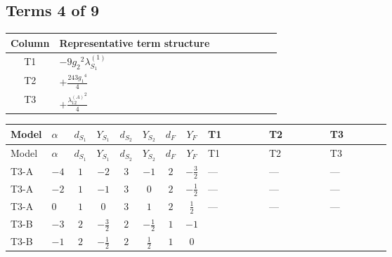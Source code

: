 \documentclass[8pt]{article}
\begin{document}
\begin{landscape}
\subsection*{Terms 4 of 9}
\begin{center}
\begin{tabular}{@{}c >{\raggedright\arraybackslash}p{0.82\linewidth}@{}}
\toprule
Column & Representative term structure \\
\midrule
T1 & \(\displaystyle -9 {g_2}^2 {\lambda_{S_1}^{(1)}}\) \\
\midrule
T2 & \(\displaystyle +\frac{243 {g_1}^4}{4}\) \\
\midrule
T3 & \(\displaystyle +\frac{{\lambda_{12}^{(A)}}^2}{4}\) \\
\midrule
\bottomrule
\end{tabular}
\end{center}
\smallskip
\tiny
\begin{longtable}{@{}llcccccc >{\raggedright\arraybackslash}p{0.21\linewidth} >{\raggedright\arraybackslash}p{0.21\linewidth} >{\raggedright\arraybackslash}p{0.21\linewidth}@{}}
\toprule
Model & $\alpha$ & $d_{S_1}$ & $Y_{S_1}$ & $d_{S_2}$ & $Y_{S_2}$ & $d_F$ & $Y_F$ & T1 & T2 & T3 \\
\midrule
\endfirsthead
\toprule
Model & $\alpha$ & $d_{S_1}$ & $Y_{S_1}$ & $d_{S_2}$ & $Y_{S_2}$ & $d_F$ & $Y_F$ & T1 & T2 & T3 \\
\midrule
\endhead
T3-A & $-4$ & $1$ & $-2$ & $3$ & $-1$ & $2$ & $-\frac{3}{2}$ & --- & --- & --- \\
\midrule
T3-A & $-2$ & $1$ & $-1$ & $3$ & $0$ & $2$ & $-\frac{1}{2}$ & --- & --- & --- \\
\midrule
T3-A & $0$ & $1$ & $0$ & $3$ & $1$ & $2$ & $\frac{1}{2}$ & --- & --- & --- \\
\midrule
T3-B & $-3$ & $2$ & $-\frac{3}{2}$ & $2$ & $-\frac{1}{2}$ & $1$ & $-1$ & \scriptsize\adjustbox{max width=\linewidth}{$\begin{gathered} -9 {g_2}^2 {\lambda_{S_1}^{(1)}}\end{gathered}$} & \scriptsize\adjustbox{max width=\linewidth}{$\begin{gathered} +\frac{243 {g_1}^4}{4}\end{gathered}$} & \scriptsize\adjustbox{max width=\linewidth}{$\begin{gathered} +\frac{{\lambda_{12}^{(A)}}^2}{4}\end{gathered}$} \\
\midrule
T3-B & $-1$ & $2$ & $-\frac{1}{2}$ & $2$ & $\frac{1}{2}$ & $1$ & $0$ & \scriptsize\adjustbox{max width=\linewidth}{$\begin{gathered} -9 {g_2}^2 {\lambda_{S_1}^{(1)}}\end{gathered}$} & \scriptsize\adjustbox{max width=\linewidth}{$\begin{gathered} +\frac{3 {g_1}^4}{4}\end{gathered}$} & \scriptsize\adjustbox{max width=\linewidth}{$\begin{gathered} +\frac{{\lambda_{12}^{(A)}}^2}{4}\end{gathered}$} \\

\end{longtable}
\end{landscape}
\end{document}
